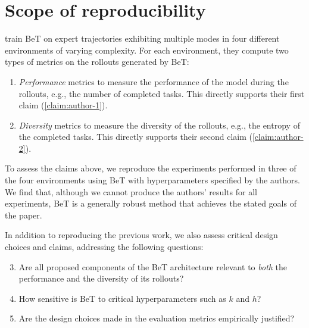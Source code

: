 \section{Scope of reproducibility}
\label{sec:intro-scope}

\citet{shafiullah2022behavior} train BeT on expert trajectories exhibiting multiple modes in four different environments of varying complexity. 
For each environment, they compute two types of metrics on the rollouts generated by BeT:

\begin{enumerate}
    \item \emph{Performance} metrics to measure the performance of the model during the rollouts, e.g., the number of completed tasks. 
    This directly supports their first claim (\ref{claim:author-1}).
    \item \emph{Diversity} metrics to measure the diversity of the rollouts, e.g., the entropy of the completed tasks.
    This directly supports their second claim (\ref{claim:author-2}).
\end{enumerate}

To assess the claims above, we reproduce the experiments performed in three of the four environments using BeT with hyperparameters specified by the authors.
We find that, although we cannot produce the authors' results for all experiments, BeT is a generally robust method that achieves the stated goals of the paper.

In addition to reproducing the previous work, we also assess critical design choices and claims, addressing the following questions:
\begin{enumerate}
\setcounter{enumi}{2}
    \item Are all proposed components of the BeT architecture relevant to \textit{both} the performance and the diversity of its rollouts?\label{claim:ablation}
    \item How sensitive is BeT to critical hyperparameters such as $k$ and $h$?\label{claim:hyperparameters}
    \item Are the design choices made in the evaluation metrics empirically justified?\label{claim:evaluation-metrics}
\end{enumerate}